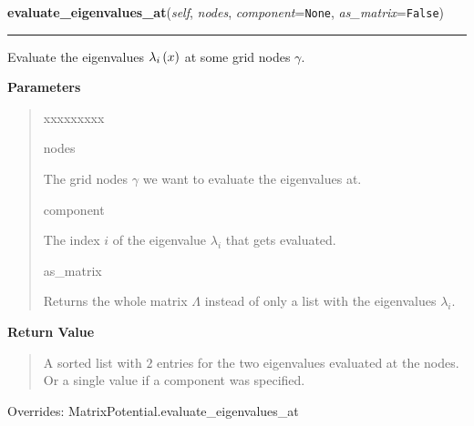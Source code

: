 \hspace{.8\funcindent}\begin{boxedminipage}{\funcwidth}

    \raggedright \textbf{evaluate\_eigenvalues\_at}(\textit{self}, \textit{nodes}, \textit{component}={\tt None}, \textit{as\_matrix}={\tt False})

    \vspace{-1.5ex}

    \rule{\textwidth}{0.5\fboxrule}
\setlength{\parskip}{2ex}
    Evaluate the eigenvalues
    $\lambda_i\left( x \right)$ at some grid
    nodes $\gamma$.

\setlength{\parskip}{1ex}
      \textbf{Parameters}
      \vspace{-1ex}

      \begin{quote}
        \begin{Ventry}{xxxxxxxxx}

          \item[nodes]

          The grid nodes $\gamma$ we want to evaluate the
          eigenvalues at.

          \item[component]

          The index $i$ of the eigenvalue $\lambda_i$
          that gets evaluated.

          \item[as\_matrix]

          Returns the whole matrix $\Lambda$ instead of
          only a list with the eigenvalues $\lambda_i$.

        \end{Ventry}

      \end{quote}

      \textbf{Return Value}
    \vspace{-1ex}

      \begin{quote}
      A sorted list with $2$ entries for the two eigenvalues evaluated at
      the nodes. Or a single value if a component was specified.

      \end{quote}



      Overrides: MatrixPotential.evaluate\_eigenvalues\_at

    \end{boxedminipage}

